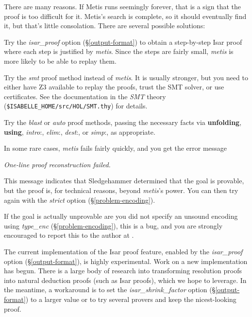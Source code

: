 \documentclass[a4paper,12pt]{article}
\begin{document}

There are many reasons. If Metis runs seemingly forever, that is a sign that the
proof is too difficult for it. Metis's search is complete, so it should
eventually find it, but that's little consolation. There are several possible
solutions:

\begin{enum}
\item[\labelitemi] Try the \textit{isar\_proof} option (\S\ref{output-format}) to
obtain a step-by-step Isar proof where each step is justified by \textit{metis}.
Since the steps are fairly small, \textit{metis} is more likely to be able to
replay them.

\item[\labelitemi] Try the \textit{smt} proof method instead of \textit{metis}. It
is usually stronger, but you need to either have Z3 available to replay the
proofs, trust the SMT solver, or use certificates. See the documentation in the
\emph{SMT} theory (\texttt{\$ISABELLE\_HOME/src/HOL/SMT.thy}) for details.

\item[\labelitemi] Try the \textit{blast} or \textit{auto} proof methods, passing
the necessary facts via \textbf{unfolding}, \textbf{using}, \textit{intro}{:},
\textit{elim}{:}, \textit{dest}{:}, or \textit{simp}{:}, as appropriate.
\end{enum}

In some rare cases, \textit{metis} fails fairly quickly, and you get the error
message

\prew
\slshape
One-line proof reconstruction failed.
\postw

This message indicates that Sledgehammer determined that the goal is provable,
but the proof is, for technical reasons, beyond \textit{metis}'s power. You can
then try again with the \textit{strict} option (\S\ref{problem-encoding}).

If the goal is actually unprovable are you did not specify an unsound encoding
using \textit{type\_enc} (\S\ref{problem-encoding}), this is a bug, and you are
strongly encouraged to report this to the author at \authoremail.


The current implementation of the Isar proof feature,
enabled by the \textit{isar\_proof} option (\S\ref{output-format}),
is highly experimental. Work on a new implementation has begun. There is a large body of
research into transforming resolution proofs into natural deduction proofs (such
as Isar proofs), which we hope to leverage. In the meantime, a workaround is to
set the \textit{isar\_shrink\_factor} option (\S\ref{output-format}) to a larger
value or to try several provers and keep the nicest-looking proof.
\end{document}
